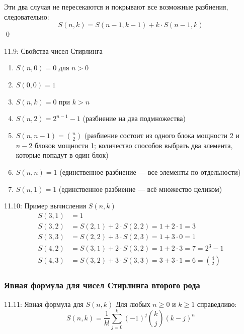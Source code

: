 \documentclass[a4paper,12pt]{article}
\begin{document}
	Эти два случая не пересекаются и покрывают все возможные разбиения, следовательно:
	\[ S(n, k) = S(n-1, k-1) + k \cdot S(n-1, k) \]
	\qed
	
	\begin{propertybox}{11.9: Свойства чисел Стирлинга}
		\begin{enumerate}
			\item \(S(n, 0) = 0\) для \(n > 0\)
			\item \(S(0, 0) = 1\)
			\item \(S(n, k) = 0\) при \(k > n\)
			\item \(S(n, 2) = 2^{n-1} - 1\) (разбиение на два подмножества)
			\item \(S(n, n-1) = \binom{n}{2}\) (разбиение состоит из одного блока мощности 2 и \(n-2\) блоков мощности 1; количество способов выбрать два элемента, которые попадут в один блок)
			\item \(S(n, n) = 1\) (единственное разбиение — все элементы по отдельности)
			\item \(S(n, 1) = 1\) (единственное разбиение — всё множество целиком)
		\end{enumerate}
	\end{propertybox}
	
	\begin{examplebox}{11.10: Пример вычисления \(S{(n,k)}\)}
		\begin{align*}
			S(3,1) &= 1 \\
			S(3,2) &= S(2,1) + 2 \cdot S(2,2) = 1 + 2 \cdot 1 = 3 \\
			S(3,3) &= S(2,2) + 3 \cdot S(2,3) = 1 + 3 \cdot 0 = 1 \\
			S(4,2) &= S(3,1) + 2 \cdot S(3,2) = 1 + 2 \cdot 3 = 7 = 2^{3} - 1 \\
			S(4,3) &= S(3,2) + 3 \cdot S(3,3) = 3 + 3 \cdot 1 = 6 = \binom{4}{2}
		\end{align*}
	\end{examplebox}
	
	\subsubsection{Явная формула для чисел Стирлинга второго рода}
	
	\begin{theorembox}{11.11: Явная формула для \(S{(n,k)}\)}
		Для любых \(n \ge 0\) и \(k \ge 1\) справедливо:
		\[ S(n, k) = \frac{1}{k!} \sum_{j=0}^{k} (-1)^j \binom{k}{j} (k-j)^n \]
	\end{theorembox}
	
\end{document}

